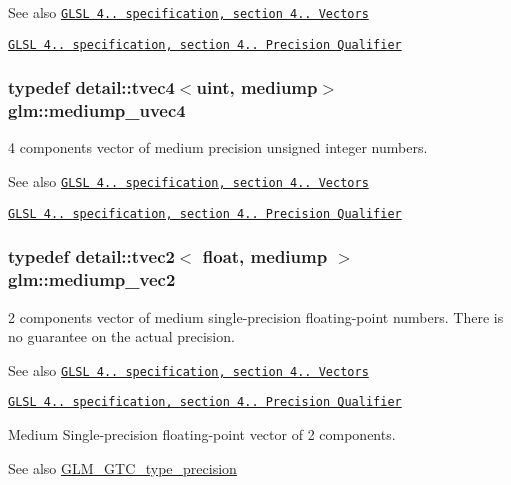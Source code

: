 \begin{DoxySeeAlso}{See also}
\href{http://www.opengl.org/registry/doc/GLSLangSpec.4.20.8.pdf}{\tt G\+L\+SL 4.. specification, section 4.. Vectors} 

\href{http://www.opengl.org/registry/doc/GLSLangSpec.4.20.8.pdf}{\tt G\+L\+SL 4.. specification, section 4.. Precision Qualifier} 
\end{DoxySeeAlso}
\subsubsection[{\texorpdfstring{mediump\+\_\+uvec4}{mediump_uvec4}}]{\setlength{\rightskip}{0pt plus 5cm}typedef detail\+::tvec4$<$uint, mediump$>$ {\bf glm\+::mediump\+\_\+uvec4}}\hypertarget{group__core__precision_gad90c29c2643136a9bcb1165eac47c810}{}\label{group__core__precision_gad90c29c2643136a9bcb1165eac47c810}
4 components vector of medium precision unsigned integer numbers.

\begin{DoxySeeAlso}{See also}
\href{http://www.opengl.org/registry/doc/GLSLangSpec.4.20.8.pdf}{\tt G\+L\+SL 4.. specification, section 4.. Vectors} 

\href{http://www.opengl.org/registry/doc/GLSLangSpec.4.20.8.pdf}{\tt G\+L\+SL 4.. specification, section 4.. Precision Qualifier} 
\end{DoxySeeAlso}
\subsubsection[{\texorpdfstring{mediump\+\_\+vec2}{mediump_vec2}}]{\setlength{\rightskip}{0pt plus 5cm}typedef detail\+::tvec2$<$ float, mediump $>$ {\bf glm\+::mediump\+\_\+vec2}}\hypertarget{group__core__precision_ga1365858c541931eb8a7473fa85a1d1cf}{}\label{group__core__precision_ga1365858c541931eb8a7473fa85a1d1cf}
2 components vector of medium single-\/precision floating-\/point numbers. There is no guarantee on the actual precision.

\begin{DoxySeeAlso}{See also}
\href{http://www.opengl.org/registry/doc/GLSLangSpec.4.20.8.pdf}{\tt G\+L\+SL 4.. specification, section 4.. Vectors} 

\href{http://www.opengl.org/registry/doc/GLSLangSpec.4.20.8.pdf}{\tt G\+L\+SL 4.. specification, section 4.. Precision Qualifier}
\end{DoxySeeAlso}
Medium Single-\/precision floating-\/point vector of 2 components. \begin{DoxySeeAlso}{See also}
\hyperlink{group__gtc__type__precision}{G\+L\+M\+\_\+\+G\+T\+C\+\_\+type\+\_\+precision} 
\end{DoxySeeAlso}
